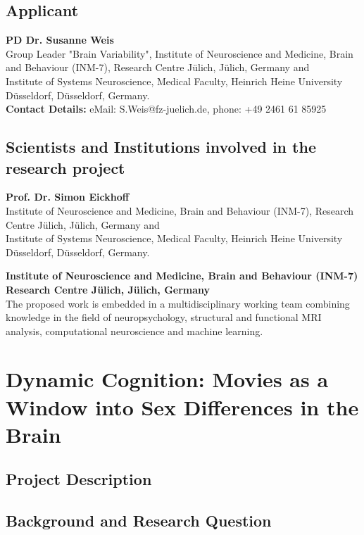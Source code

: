 \documentclass[11pt,a4paper]{article}
\begin{document}
\subsection*{Applicant} 
\vspace{1ex}
\textbf{PD Dr. Susanne Weis}\\
Group Leader "Brain Variability", Institute of Neuroscience and Medicine, Brain and Behaviour (INM-7), Research Centre Jülich, Jülich, Germany and \\
Institute of Systems Neuroscience, Medical Faculty, Heinrich Heine University Düsseldorf, Düsseldorf, Germany. \\
\textbf{Contact Details:} eMail: S.Weis@fz-juelich.de, phone: +49 2461 61 85925\\

\subsection*{Scientists and Institutions involved in the research project}
\vspace{1ex}
\textbf{Prof. Dr. Simon Eickhoff}\\
Institute of Neuroscience and Medicine, Brain and Behaviour (INM-7), Research Centre Jülich, Jülich, Germany and \\
Institute of Systems Neuroscience, Medical Faculty, Heinrich Heine University Düsseldorf, Düsseldorf, Germany. 

\textbf{Institute of Neuroscience and Medicine, Brain and Behaviour (INM-7) Research Centre Jülich, 
Jülich, Germany}\\
The proposed work is embedded in a multidisciplinary working team combining knowledge in the field of neuropsychology, structural and functional MRI analysis, 
computational neuroscience and machine learning. 


\newpage

\section*{\Large\textbf{Dynamic Cognition: Movies as a Window into Sex Differences in the Brain}}
\hfill

\subsection*{Project Description} 
\subsection*{Background and Research Question} 
\end{document}
